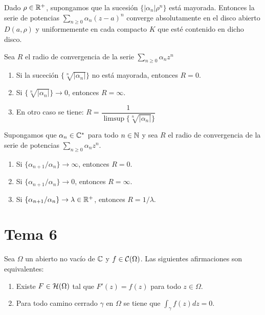 \documentclass[12pt]{article}
\begin{document}
    \begin{lema} Dado $\rho\in \mathbb{R}^+$, supongamos que la sucesión $\{|\alpha_n|\rho^n\}$ está mayorada. Entonces la serie de potencias $\sum\limits_{n\geq 0} \alpha_n ( z-a)^n$ converge absolutamente en el disco abierto $D(a, \rho)$ y uniformemente en cada compacto $K$ que esté contenido en dicho disco.
    \end{lema}

    \begin{prop}
        Sea $R$ el radio de convergencia de la serie $\sum\limits_{n\geq0}\alpha_nz^n$
        \begin{enumerate}
            \item Si la suceción $\{\sqrt[n]{|\alpha_n|}\}$ no está mayorada, entonces $R=0$.
            \item Si $\{\sqrt[n]{|\alpha_n|}\} \to 0$, entonces $R=\infty$.
            \item En otro caso se tiene: $R = \dfrac{1}{\limsup \{\sqrt[n]{|\alpha_n|}\}}$
        \end{enumerate}
    \end{prop}

    \begin{coro}
        Supongamos que $\alpha_n\in \mathbb{C}^*$ para todo $n\in \mathbb{N}$ y sea $R$ el radio de convergencia de la serie de potencias $\sum\limits_{n\geq 0} \alpha_n z^n$.
        \begin{enumerate}
            \item Si $\{\alpha_{n+1} / \alpha_n\} \to \infty$, entonces $R=0$.
            \item Si $\{\alpha_{n+1} / \alpha_n\} \to 0$, entonces $R=\infty$.
            \item Si $\{\alpha_{n+1} / \alpha_n\} \to \lambda \in \mathbb{R}^+$, entonces $R=1/\lambda$.
        \end{enumerate}
    \end{coro}

    \section{Tema 6}

    \begin{teo} Sea $\Omega$ un abierto no vacío de $\mathbb{C}$ y $f\in \mathcal{C}(\Omega)$. Las siguientes afirmaciones son equivalentes:
    \begin{enumerate}
        \item Existe $F\in \mathcal{H}(\Omega)$ tal que $F'(z) = f(z)$ para todo $z\in \Omega$.
        \item Para todo camino cerrado $\gamma$ en $\Omega$ se tiene que $\displaystyle\int_\gamma f(z)dz = 0$.
    \end{enumerate}
        
    \end{teo}
\end{document}
